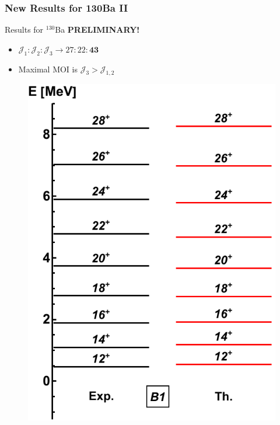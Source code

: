 \documentclass{beamer}
\begin{document}
\begin{frame}
  \frametitle{New Results for 130Ba II}
  \begin{exampleblock}{Results for $^{130}$Ba \textbf{PRELIMINARY!}}
      \begin{itemize}
        \item $\mathcal{J}_1:\mathcal{J}_2:\mathcal{J}_3\to 27:22:\mathbf{43}$
        \item Maximal MOI is $\mathcal{J}_{3}>\mathcal{J}_{1,2}$
      \end{itemize}
\end{exampleblock}
\begin{figure}
  \centering
  \includegraphics[scale=0.39]{Figs/ba130-band1.pdf}

\end{figure}
\end{frame}
\end{document}
